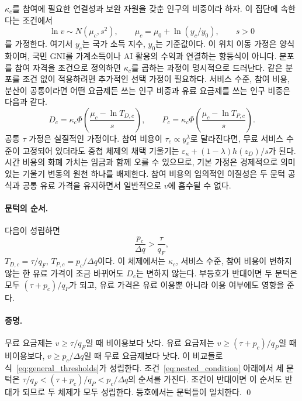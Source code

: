 \documentclass[11pt]{article}
\theoremstyle{definition}
\theoremstyle{remark}
\begin{document}
$\kappa_c$를 참여에 필요한 연결성과 보완 자원을 갖춘 인구의 비중이라 하자. 이 집단에 속한다는 조건에서
\begin{equation}
 \ln v\sim N(\mu_c,s^2),\qquad
 \mu_c=\mu_0+\ln(y_c/y_0),\qquad s>0
 \label{eq:conditional_distribution}
\end{equation}
를 가정한다. 여기서 $y_c$는 국가 소득 지수, $y_0$는 기준값이다. 이 위치 이동 가정은 양식화이며, 국민 GNI를 가계소득이나 AI 활용의 수익과 연결하는 항등식이 아니다. 분포를 참여 자격을 조건으로 정의하면 $\kappa_c$를 곱하는 과정이 명시적으로 드러난다. 같은 분포를 조건 없이 적용하려면 추가적인 선택 가정이 필요하다. 서비스 수준, 참여 비용, 분산이 공통이라면 어떤 요금제든 쓰는 인구 비중과 유료 요금제를 쓰는 인구 비중은 다음과 같다.
\begin{equation}
 D_c=\kappa_c\Phi\left(\frac{\mu_c-\ln T_{D,c}}{s}\right),\qquad
 P_c=\kappa_c\Phi\left(\frac{\mu_c-\ln T_{P,c}}{s}\right).
 \label{eq:general_shares}
\end{equation}
공통 $\tau$ 가정은 실질적인 가정이다. 참여 비용이 $\tau_c\propto y_c^\lambda$로 달라진다면, 무료 서비스 수준이 고정되어 있더라도 중첩 체제의 채택 기울기는 $\varepsilon_\kappa+(1-\lambda)h(z_D)/s$가 된다. 시간 비용의 화폐 가치는 임금과 함께 오를 수 있으므로, 기본 가정은 경제적으로 의미 있는 기울기 변동의 원천 하나를 배제한다. 참여 비용의 임의적인 이질성은 두 문턱 공식과 공통 유료 가격을 유지하면서 일반적으로 $v$에 흡수될 수 없다.

\paragraph{문턱의 순서.}
다음이 성립하면
\begin{equation}
 \frac{p_c}{\Delta q}>\frac{\tau}{q_F},
 \label{eq:nested_condition}
\end{equation}
$T_{D,c}=\tau/q_F$, $T_{P,c}=p_c/\Delta q$이다.
이 체제에서는 $\kappa_c$, 서비스 수준, 참여 비용이 변하지 않는 한 유료 가격이 조금 바뀌어도 $D_c$는 변하지 않는다. 부등호가 반대이면 두 문턱은 모두 $(\tau+p_c)/q_P$가 되고, 유료 가격은 유료 이용뿐 아니라 이용 여부에도 영향을 준다.

\paragraph{증명.}
무료 요금제는 $v\geq\tau/q_F$일 때 비이용보다 낫다. 유료 요금제는 $v\geq(\tau+p_c)/q_P$일 때 비이용보다, $v\geq p_c/\Delta q$일 때 무료 요금제보다 낫다. 이 비교들로 식~\eqref{eq:general_thresholds}가 성립한다. 조건~\eqref{eq:nested_condition} 아래에서 세 문턱은 $\tau/q_F<(\tau+p_c)/q_P<p_c/\Delta q$의 순서를 가진다. 조건이 반대이면 이 순서도 반대가 되므로 두 체제가 모두 성립한다. 등호에서는 문턱들이 일치한다.
\qed
\end{document}
